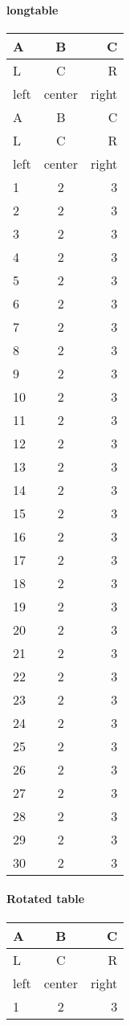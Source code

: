 \documentclass{article}
\begin{document}
\paragraph{longtable}
\begin{longtable}[l]{| l | c | r |}
\hline
A & B & C\\
\hline
L & C & R\\
left & center & right\\
\hline
\endfirsthead
\hline
A & B & C\\
\hline
L & C & R\\
left & center & right\\
\hline
\endhead
1 & 2 & 3\\
2 & 2 & 3\\
3 & 2 & 3\\
4 & 2 & 3\\
5 & 2 & 3\\
6 & 2 & 3\\
7 & 2 & 3\\
8 & 2 & 3\\
9 & 2 & 3\\
10 & 2 & 3\\
11 & 2 & 3\\
12 & 2 & 3\\
13 & 2 & 3\\
14 & 2 & 3\\
15 & 2 & 3\\
16 & 2 & 3\\
17 & 2 & 3\\
18 & 2 & 3\\
19 & 2 & 3\\
20 & 2 & 3\\
21 & 2 & 3\\
22 & 2 & 3\\
23 & 2 & 3\\
24 & 2 & 3\\
25 & 2 & 3\\
26 & 2 & 3\\
27 & 2 & 3\\
28 & 2 & 3\\
29 & 2 & 3\\
30 & 2 & 3\\
\hline
\end{longtable}

\begin{sidewaystable}[p]
\paragraph{Rotated table}
  \begin{center}
		\begin{tabular}{l  c  r}
		\toprule
		A & B & C\\
		\midrule
		L & C & R\\
		left & center & right\\
		1 & 2 & 3\\
		\bottomrule
		\end{tabular}
	\end{center}
\end{sidewaystable}
\newpage
\end{document}
